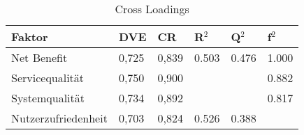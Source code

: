 \begin{table}[h] 
\caption{Cross Loadings}
\label{tab:Cross-Loadings} 
\begin{tabular}{@{}llllll@{}} \toprule

\textbf{Faktor} & \textbf{DVE} & \textbf{CR} & \textbf{R$^2$} & \textbf{Q$^2$} & \textbf{f$^2$} \\ \midrule

 Net Benefit 		& 0,725 		& 0,839 & 0.503 & 0.476 		& 1.000 \\
 
 Servicequalität 	& 0,750 		& 0,900 & 		& 			& 0.882 \\

 Systemqualität 	& 0,734 		& 0,892 & 		& 			& 0.817 \\

 Nutzerzufriedenheit & 0,703 	& 0,824 	& 0.526 	& 0.388		&  	 \\ \bottomrule
\end{tabular}	
\end{table}











